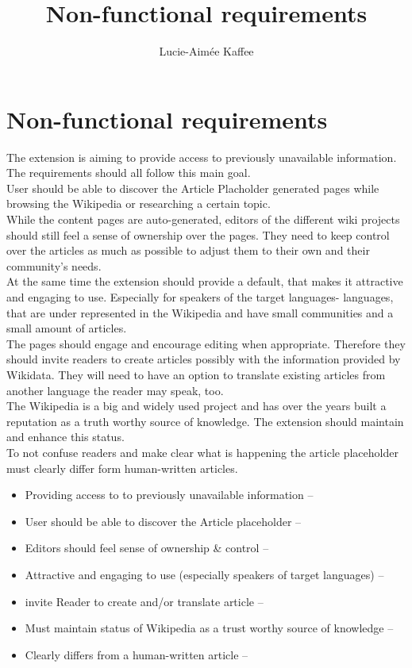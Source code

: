 \documentclass[11pt]{article}
\title {{Non-functional requirements}}
\author {Lucie-Aim\'{e}e Kaffee}
\date{}
\begin{document}
\section{Non-functional requirements}

The extension is aiming to provide access to previously unavailable information. The requirements should all follow this main goal. \\
User should be able to discover the Article Placholder generated pages while browsing the Wikipedia or researching a certain topic. \\
While the content pages are auto-generated, editors of the different wiki projects should still feel a sense of ownership over the pages. They need to keep control over the articles as much as possible to adjust them to their own and their community's needs.  \\
At the same time the extension should provide a default, that makes it attractive and engaging to use. Especially for speakers of the target languages- languages, that are under represented in the Wikipedia and have small communities and a small amount of articles. \\
The pages should engage and encourage editing when appropriate. Therefore they should invite readers to create articles possibly with the information provided by Wikidata. They will need to have an option to translate existing articles from another language the reader may speak, too. \\
The Wikipedia is a big and widely used project and has over the years built a reputation as a truth worthy source of knowledge. The extension should maintain and enhance this status. \\
To not confuse readers and make clear what is happening the article placeholder must clearly differ form human-written articles. \\





\begin{itemize}
\item Providing access to to previously unavailable information --
\item User should be able to discover the Article placeholder -- 
\item Editors should feel sense of ownership \& control -- 
\item Attractive and engaging to use (especially speakers of target languages) --
\item invite Reader to create and/or translate article --
\item Must maintain status of Wikipedia as a trust worthy source of knowledge --
\item Clearly differs from a human-written article --
\end{itemize}
\end{document}
